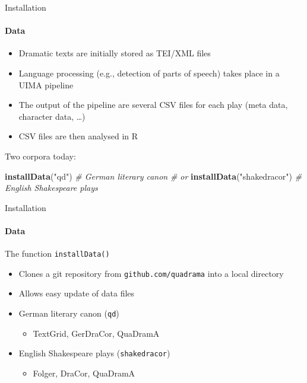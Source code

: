\documentclass[ignorenonframetext,]{beamer}
\newenvironment{Shaded}{\begin{snugshade}}{\end{snugshade}}
\newcommand{\CommentTok}[1]{\textcolor[rgb]{0.56,0.35,0.01}{\textit{#1}}}
\newcommand{\KeywordTok}[1]{\textcolor[rgb]{0.13,0.29,0.53}{\textbf{#1}}}
\newcommand{\NormalTok}[1]{#1}
\newcommand{\StringTok}[1]{\textcolor[rgb]{0.31,0.60,0.02}{#1}}
\providecommand{\tightlist}{%
  \setlength{\itemsep}{0pt}\setlength{\parskip}{0pt}}
\begin{document}
\begin{frame}[fragile]{Installation}
\protect\hypertarget{installation-2}{}

\framesubtitle{Data}

\begin{itemize}
\tightlist
\item
  Dramatic texts are initially stored as TEI/XML files
\item
  Language processing (e.g., detection of parts of speech) takes place
  in a UIMA pipeline
\item
  The output of the pipeline are several CSV files for each play (meta
  data, character data, \dots)
\item
  CSV files are then analysed in R
\end{itemize}

\pause

Two corpora today:

\begin{Shaded}
\begin{Highlighting}[]
\KeywordTok{installData}\NormalTok{(}\StringTok{"qd"}\NormalTok{) }\CommentTok{# German literary canon}
\CommentTok{# or}
\KeywordTok{installData}\NormalTok{(}\StringTok{"shakedracor"}\NormalTok{) }\CommentTok{# English Shakespeare plays}
\end{Highlighting}
\end{Shaded}

\end{frame}

\begin{frame}[fragile]{Installation}
\protect\hypertarget{installation-3}{}

\framesubtitle{Data}

The function \texttt{installData()}

\begin{itemize}
\tightlist
\item
  Clones a git repository from \texttt{github.com/quadrama} into a local
  directory
\item
  Allows easy update of data files
\item
  German literary canon (\texttt{qd})

  \begin{itemize}
  \tightlist
  \item
    TextGrid, GerDraCor, QuaDramA
  \end{itemize}
\item
  English Shakespeare plays (\texttt{shakedracor})

  \begin{itemize}
  \tightlist
  \item
    Folger, DraCor, QuaDramA
  \end{itemize}
\end{itemize}

\end{frame}
\end{document}
